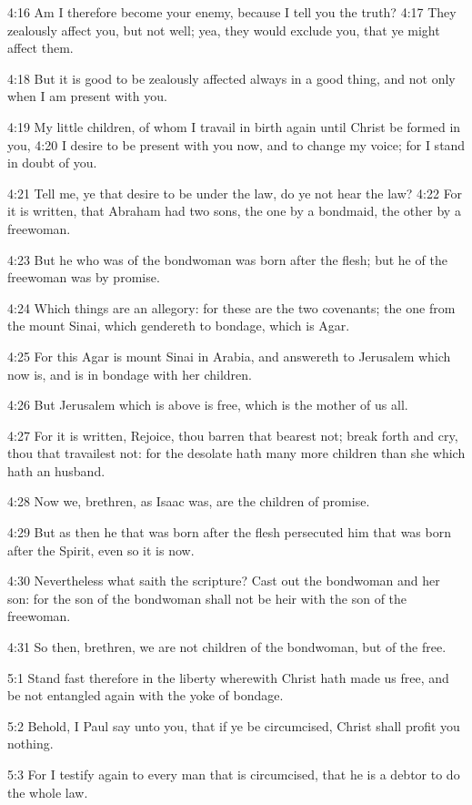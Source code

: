 4:16 Am I therefore become your enemy, because I tell you the truth?
4:17 They zealously affect you, but not well; yea, they would exclude
you, that ye might affect them.

4:18 But it is good to be zealously affected always in a good thing,
and not only when I am present with you.

4:19 My little children, of whom I travail in birth again until Christ
be formed in you, 4:20 I desire to be present with you now, and to
change my voice; for I stand in doubt of you.

4:21 Tell me, ye that desire to be under the law, do ye not hear the
law?  4:22 For it is written, that Abraham had two sons, the one by a
bondmaid, the other by a freewoman.

4:23 But he who was of the bondwoman was born after the flesh; but he
of the freewoman was by promise.

4:24 Which things are an allegory: for these are the two covenants;
the one from the mount Sinai, which gendereth to bondage, which is
Agar.

4:25 For this Agar is mount Sinai in Arabia, and answereth to
Jerusalem which now is, and is in bondage with her children.

4:26 But Jerusalem which is above is free, which is the mother of us
all.

4:27 For it is written, Rejoice, thou barren that bearest not; break
forth and cry, thou that travailest not: for the desolate hath many
more children than she which hath an husband.

4:28 Now we, brethren, as Isaac was, are the children of promise.

4:29 But as then he that was born after the flesh persecuted him that
was born after the Spirit, even so it is now.

4:30 Nevertheless what saith the scripture? Cast out the bondwoman and
her son: for the son of the bondwoman shall not be heir with the son
of the freewoman.

4:31 So then, brethren, we are not children of the bondwoman, but of
the free.

5:1 Stand fast therefore in the liberty wherewith Christ hath made us
free, and be not entangled again with the yoke of bondage.

5:2 Behold, I Paul say unto you, that if ye be circumcised, Christ
shall profit you nothing.

5:3 For I testify again to every man that is circumcised, that he is a
debtor to do the whole law.

